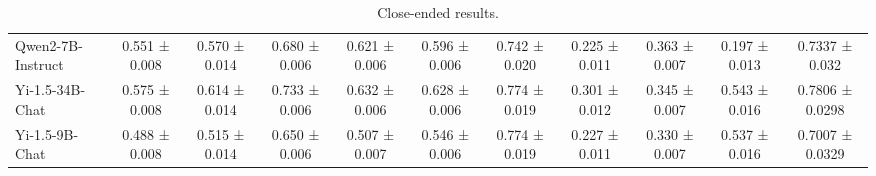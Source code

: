 \begin{table*}[h]
{\begin{tabular}{l|cccccccccc}
Qwen2-7B-Instruct & 0.551 ± 0.008 & 0.570 ± 0.014 & 0.680 ± 0.006	& 0.621 ± 0.006   & 0.596 ± 0.006 & 0.742 ± 0.020 & 0.225 ± 0.011 & 0.363 ± 0.007 & 0.197 ± 0.013 & 0.7337 ± 0.032 \\
Yi-1.5-34B-Chat & 0.575 ± 0.008 & 0.614 ± 0.014 & 0.733 ± 0.006	& 0.632 ± 0.006  & 0.628 ± 0.006 & 0.774 ± 0.019 & 0.301 ± 0.012 & 0.345 ± 0.007 & 0.543 ± 0.016 & 0.7806 ± 0.0298 \\
Yi-1.5-9B-Chat & 0.488 ± 0.008 & 0.515 ± 0.014 & 0.650 ± 0.006	& 0.507 ± 0.007  & 0.546 ± 0.006 & 0.774 ± 0.019 & 0.227 ± 0.011 & 0.330 ± 0.007 & 0.537 ± 0.016 & 0.7007 ± 0.0329 \\
\bottomrule
\end{tabular}
} 
\caption{Close-ended results.}
\label{tab:close_ended_benchmarks}
\end{table*}

